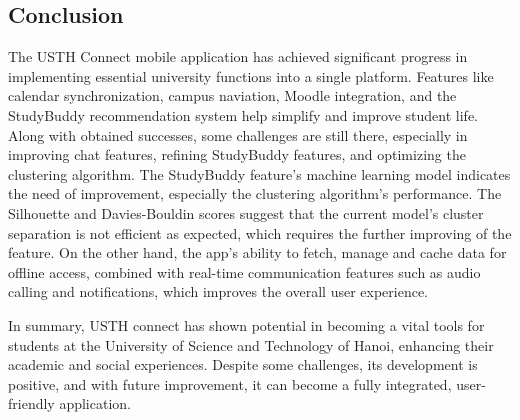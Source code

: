 \documentclass{article}
\begin{document}
\subsection{Conclusion}
The USTH Connect mobile application has achieved significant progress in implementing essential university functions into a single platform. Features like calendar synchronization, campus naviation, Moodle integration, and the StudyBuddy recommendation system help simplify and improve student life.
Along with obtained successes, some challenges are still there, especially in improving chat features, refining StudyBuddy features, and optimizing the clustering algorithm.
The StudyBuddy feature's machine learning model indicates the need of improvement, especially the clustering algorithm's performance. The Silhouette and Davies-Bouldin scores suggest that the current model's cluster separation is not efficient as expected, which requires the further improving of the feature.
On the other hand, the app's ability to fetch, manage and cache data for offline access, combined with real-time communication features such as audio calling and notifications, which improves the overall user experience.

In summary, USTH connect has shown potential in becoming a vital tools for students at the University of Science and Technology of Hanoi, enhancing their academic and social experiences. 
Despite some challenges, its development is positive, and with future improvement, it can become a fully integrated, user-friendly application.
\end{document}

